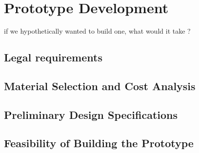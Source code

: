 \section{Prototype Development}

if we hypothetically wanted to build one, what would it take ?\\

\subsection{Legal requirements}

\subsection{Material Selection and Cost Analysis}

\subsection{Preliminary Design Specifications}

\subsection{Feasibility of Building the Prototype}

